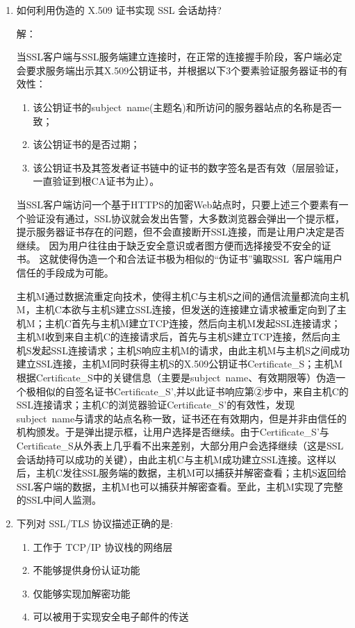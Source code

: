 \documentclass[degree=project,degree-type=project,cjk-font=noto]{thuthesis}
\begin{document}
\begin{enumerate}
\item 如何利用伪造的 X.509 证书实现 SSL 会话劫持?

  {\heiti 解：}

当SSL客户端与SSL服务端建立连接时，在正常的连接握手阶段，客户端必定会要求服务端出示其X.509公钥证书，并根据以下3个要素验证服务器证书的有效性：

\begin{enumerate}
\item 该公钥证书的subject name(主题名)和所访问的服务器站点的名称是否一致；
\item 该公钥证书的是否过期；
\item 该公钥证书及其签发者证书链中的证书的数字签名是否有效（层层验证，一直验证到根CA证书为止）。
\end{enumerate}

当SSL客户端访问一个基于HTTPS的加密Web站点时，只要上述三个要素有一个验证没有通过，SSL协议就会发出告警，大多数浏览器会弹出一个提示框，提示服务器证书存在的问题，但不会直接断开SSL连接，而是让用户决定是否继续。
因为用户往往由于缺乏安全意识或者图方便而选择接受不安全的证书。
这就使得伪造一个和合法证书极为相似的“伪证书”骗取SSL 客户端用户信任的手段成为可能。

主机M通过数据流重定向技术，使得主机C与主机S之间的通信流量都流向主机M，主机C本欲与主机S建立SSL连接，但发送的连接建立请求被重定向到了主机M；主机C首先与主机M建立TCP连接，然后向主机M发起SSL连接请求；主机M收到来自主机C的连接请求后，首先与主机S建立TCP连接，然后向主机S发起SSL连接请求；主机S响应主机M的请求，由此主机M与主机S之间成功建立SSL连接，主机M同时获得主机S的X.509公钥证书Certificate\_S；主机M根据Certificate\_S中的关键信息（主要是subject name、有效期限等）伪造一个极相似的自签名证书Certificate\_S’,并以此证书响应第②步中，来自主机C的SSL连接请求；主机C的浏览器验证Certificate\_S’的有效性，发现subject name与请求的站点名称一致，证书还在有效期内，但是并非由信任的机构颁发。于是弹出提示框，让用户选择是否继续。由于Certificate\_S’与Certificate\_S从外表上几乎看不出来差别，大部分用户会选择继续（这是SSL会话劫持可以成功的关键），由此主机C与主机M成功建立SSL连接。这样以后，主机C发往SSL服务端的数据，主机M可以捕获并解密查看；主机S返回给SSL客户端的数据，主机M也可以捕获并解密查看。至此，主机M实现了完整的SSL中间人监测。


\item 下列对 SSL/TLS 协议描述正确的是:
\begin{enumerate}
  \item 工作于 TCP/IP 协议栈的网络层
  \item 不能够提供身份认证功能
  \item 仅能够实现加解密功能
  \item 可以被用于实现安全电子邮件的传送
\end{enumerate}


\end{enumerate}
\end{document}
